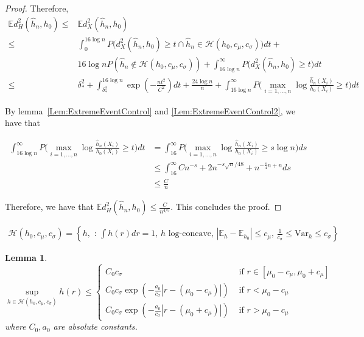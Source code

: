 \documentclass[12pt]{article}
\newtheorem{lemma}[theorem]{Lemma}
\begin{document}
\begin{proof}
Therefore,
\begin{align*}
  \mathbb{E} d_H^2(\hat{h}_n, h_0) \leq & \mathbb{E} d_X^2( \hat{h}_n, h_0) \\
                           \leq & \int_0^{16 \log n}  P\Big( d_X^2(\hat{h}_n, h_0) \geq t \cap
                             \hat{h}_n \in \mathcal{H}(h_0, c_\mu, c_\sigma) \Big) dt + \\
                             & 16 \log n P( \hat{h}_n \notin \mathcal{H}(h_0, c_\mu, c_\sigma)) +
                             \int_{16 \log n}^\infty P\Big( d_X^2(\hat{h}_n, h_0) \geq t \Big) dt
                             \\
                           \leq & 
                             \delta_*^2 +
                             \int_{\delta^2_*}^{16 \log n}  \exp\left( - \frac{n t^2}{C^2} \right) dt + \frac{24 \log n}{n} +
                             \int_{16 \log n}^\infty P\Big( \max_{i=1,...,n} \log \frac{\hat{h}_n(X_i)}{h_0(X_i)}  \geq t \Big) dt
\end{align*}

By lemma~\ref{Lem:ExtremeEventControl} and \ref{Lem:ExtremeEventControl2}, we have that

\begin{align*}
  \int_{16 \log n}^\infty P\Big( \max_{i=1,...,n} \log \frac{\hat{h}_n(X_i)}{h_0(X_i)}  \geq t \Big) dt
  &= \int_{16}^\infty  P\Big( \max_{i=1,...,n} \log \frac{\hat{h}_n(X_i)}{h_0(X_i)}  \geq s\log n \Big) ds \\
  &\leq \int_{16}^\infty C n^{-s} + 2n^{-s \sqrt{n}/48} + n^{- \frac{s}{4} n + n} ds \\
  &\leq \frac{C}{n}
\end{align*}

Therefore, we have that $\mathbb{E} d_H^2(\hat{h}_n, h_0) \leq \frac{C}{n^{4/5}}$. This concludes the proof.
\end{proof}


\begin{align}
  \mathcal{H}(h_0, c_\mu, c_{\sigma}) = \left\{ h,\, \,:\, \int h(r) dr = 1,\, h \textrm{ log-concave},\,
  |\mathbb{E}_h - \mathbb{E}_{h_0}| \leq c_\mu,\, \frac{1}{c_\sigma} \leq \textrm{Var}_{h} \leq c_\sigma \right\}
  \label{eqn:moment_bounded_class}
\end{align}

\begin{lemma}
  \[
    \sup_{h \in \mathcal{H}(h_0, c_\mu, c_\sigma)} h(r) \leq \left\{
      \begin{array}{cc}
        C_0 c_\sigma  & \textrm{ if $r \in [\mu_0 - c_\mu, \mu_0 + c_\mu]$} \\
        C_0 c_\sigma \exp( - \frac{a_0}{c_{\sigma}} |r - (\mu_0 - c_\mu)|)  & \textrm{ if $r < \mu_0 - c_\mu$} \\
        C_0 c_\sigma \exp( - \frac{a_0}{c_{\sigma}} |r - (\mu_0 + c_\mu)|)  & \textrm{ if $r > \mu_0 - c_\mu$}
      \end{array} \right.
  \]
  where $C_0, a_0$ are absolute constants.
\end{lemma}
\end{document}
